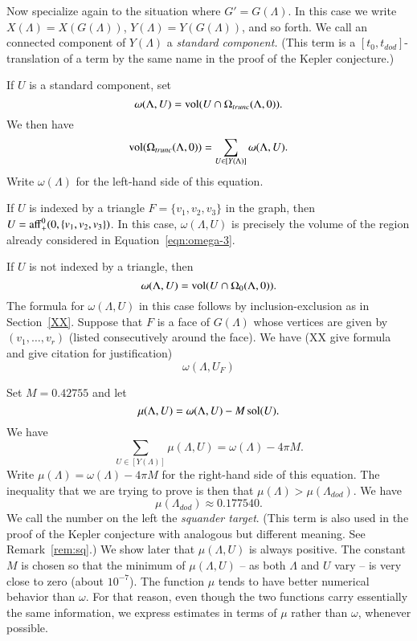 Now specialize again to the situation where $G'=G(\Lambda)$.
In this case we write $X(\Lambda)=X(G(\Lambda))$, $Y(\Lambda)=Y(G(\Lambda))$,
and so forth.
 We call an connected component of $Y(\Lambda)$
a {\it standard component.}  (This term is a
$[t_0,t_{dod}]$-translation of a term by the same name
in the proof of the Kepler conjecture.)

If $U$ is a standard component, set
  $$\omega(\Lambda,U) = {\operatorname{vol}}(U\cap \Omega_{trunc}(\Lambda,0)).$$
We then have
  $${\operatorname{vol}}(\Omega_{trunc}(\Lambda,0)) = 
  \sum_{U\in[Y(\Lambda)]} \omega(\Lambda,U).$$
Write $\omega(\Lambda)$ for the left-hand side of this equation.

If $U$ is indexed by a triangle $F=\{v_1,v_2,v_3\}$ in the graph,
then $U = {\operatorname{aff}}_+^0(0,\{v_1,v_2,v_3\})$.  In this case,
$\omega(\Lambda,U)$ is precisely the volume of the region
already considered in Equation~\ref{eqn:omega-3}.

If $U$ is not indexed by a triangle, then
   $$\omega(\Lambda,U) = {\operatorname{vol}}(U\cap\Omega_0(\Lambda,0)).$$
The formula for $\omega(\Lambda,U)$ in this case follows
by inclusion-exclusion as in Section~\ref{XX}.  Suppose
that $F$ is a face of $G(\Lambda)$ whose vertices are given
by $(v_1,\ldots,v_r)$ (listed consecutively around the face).
We have (XX give formula and give citation for justification)
$$
\omega(\Lambda,U_F) 
$$

Set $M=0.42755$ and let
 $$\mu(\Lambda,U)= \omega(\Lambda,U) - M \operatorname{sol}(U).$$
We have
$$
\sum_{U\in[Y(\Lambda)]} \mu(\Lambda,U) = \omega(\Lambda) -  4\pi M.
$$
Write $\mu(\Lambda)= \omega(\Lambda)- 4\pi M$ for the right-hand side of this equation.  The inequality that we are trying to prove is then
that $\mu(\Lambda) > \mu(\Lambda_{dod})$.  
We have 
$$
  \mu(\Lambda_{dod}) \approx 0.177540.
$$
We call the number on the left the {\it squander target}.  (This term
is also used in the proof of the Kepler conjecture with
analogous but different meaning.  See Remark~\ref{rem:sq}.)  We show
later that $\mu(\Lambda,U)$ is always positive.  The constant
$M$ is chosen so that the minimum of $\mu(\Lambda,U)$ -- as
both $\Lambda$ and $U$  vary -- is very close to zero (about $10^{-7}$).
The function $\mu$ tends to have better numerical behavior
than $\omega$.  For that reason, even though the two
functions carry essentially the same information,
we express estimates in terms
of $\mu$ rather than $\omega$, whenever possible.

